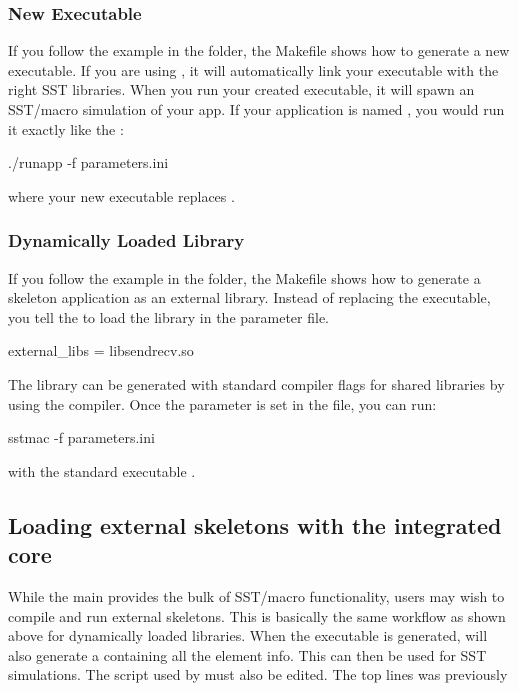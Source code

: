 \subsubsection{New Executable}
If you follow the example in the  folder,
the Makefile shows how to generate a new executable.
If you are using , it will automatically link your executable with the right SST libraries.
When you run your created executable, it will spawn an SST/macro simulation of your app.
If your application is named , you would run it exactly like the :

\begin{ShellCmd}
./runapp -f parameters.ini
\end{ShellCmd}
where your new executable replaces .

\subsubsection{Dynamically Loaded Library}
If you follow the example in the  folder,
the Makefile shows how to generate a skeleton application as an external library.
Instead of replacing the  executable, you tell the  to load the library in the parameter file.

\begin{ViFile}
external_libs = libsendrecv.so
\end{ViFile}
The library  can be generated with standard compiler flags for shared libraries by using the  compiler.
Once the  parameter is set in the file, you can run:

\begin{ShellCmd}
sstmac -f parameters.ini
\end{ShellCmd}
with the standard executable .

\subsection{Loading external skeletons with the integrated core}\label{subsec:linkageCore}
While the main  provides the bulk of SST/macro functionality, 
users may wish to compile and run external skeletons.  This is basically the same workflow as shown above for dynamically loaded libraries.
When the executable is generated, \sstmacro will also generate a  containing all the element info.
This can then be used for SST simulations.
The  script used by  must also be edited.  The top lines was previously

